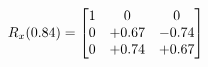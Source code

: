 \documentclass[preview]{standalone}
\begin{document}
\begin{align*}
\special{dvisvgm:raw <g id='unique000'>}R_{x}(0.84) = \begin{bmatrix}1 & 0 & 0 \\0 & +0.67 & -0.74 \\0 & +0.74 & +0.67\end{bmatrix}\special{dvisvgm:raw </g>}
\end{align*}
\end{document}
